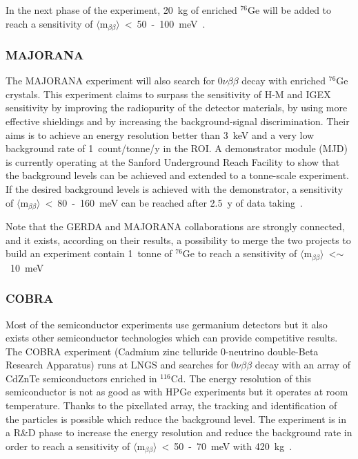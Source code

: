\documentclass[main.tex]{subfiles}
\begin{document}
\NI In the next phase of the experiment, 20~kg of enriched $^{\text{76}}$Ge will be added to reach a sensitivity of $\langle \text{m}_{\beta\beta} \rangle$~<~50~-~100~meV~\cite{GERDAprospective}.


\FloatBarrier


\subsubsection{MAJORANA}


The MAJORANA experiment will also search for 0$\nu\beta\beta$ decay with enriched $^{\text{76}}$Ge crystals. This experiment claims to surpass the sensitivity of H-M and IGEX sensitivity by improving the radiopurity of the detector materials, by using more effective shieldings and by increasing the background-signal discrimination. Their aims is to achieve an energy resolution better than 3~keV and a very low background rate of 1~count/tonne/y in the ROI. A demonstrator module (MJD) is currently operating at the Sanford Underground Reach Facility to show that the background levels can be achieved and extended to a tonne-scale experiment. If the desired background levels is achieved with the demonstrator, a sensitivity of $\langle \text{m}_{\beta\beta} \rangle$~<~80~-~160~meV can be reached after 2.5~y of data taking~\cite{MAJORANA}.


\bigskip


\NI Note that the GERDA and MAJORANA collaborations are strongly connected, and it exists, according on their results, a possibility to merge the two projects to build an experiment contain 1~tonne of $^{\text{76}}$Ge to reach a sensitivity of $\langle \text{m}_{\beta\beta} \rangle$~<$\sim$~10~meV~\cite{MAJORANAandGERDA} \\

\subsubsection{COBRA}


\NI Most of the semiconductor experiments use germanium detectors but it also exists other semiconductor technologies which can provide competitive results. The COBRA experiment (Cadmium zinc telluride 0-neutrino double-Beta Research Apparatus) runs at LNGS and searches for 0$\nu\beta\beta$ decay with an array of CdZnTe semiconductors enriched in $^{\text{116}}$Cd. The energy resolution of this semiconductor is not as good as with HPGe experiments but it operates at room temperature. Thanks to the pixellated array, the tracking and identification of the particles is possible which reduce the background level. The experiment is in a R\&D phase to increase the energy resolution and reduce the background rate in order to reach a sensitivity of $\langle \text{m}_{\beta\beta} \rangle$~<~50~-~70~meV with 420~kg~\cite{COBRA}.
\end{document}

